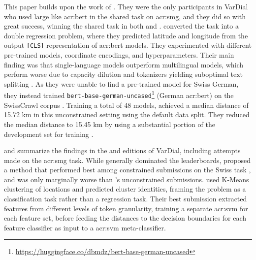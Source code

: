 This paper builds upon the work of \cite{scherrerHeLjuVarDial20202020}. They were the only participants in VarDial who used large  like \acrshort{acr:bert} in the shared task on \gls{acr:smg}, and they did so with great success, winning the shared task in both \citeyear{scherrerHeLjuVarDial20202020} and \citeyear{scherrerSocialMediaVariety2021}. \citeauthor{scherrerHeLjuVarDial20202020} converted the task into a double regression problem, where they predicted latitude and longitude from the output \texttt{[CLS]} representation of \acrshort{acr:bert} models. They experimented with different pre-trained models, coordinate encodings, and hyperparameters. Their main finding was that single-language models outperform multilingual models, which perform worse due to capacity dilution and tokenizers yielding suboptimal text splitting \citep[3]{scherrerHeLjuVarDial20202020}. As they were unable to find a pre-trained model for Swiss German, they instead trained \texttt{bert-base-german-uncased}\footnote{\url{https://huggingface.co/dbmdz/bert-base-german-uncased}} (German \acrshort{acr:bert}) on the SwissCrawl corpus \citep{linderAutomaticCreationText2020}. Training a total of 48 models, \citeauthor{scherrerHeLjuVarDial20202020} achieved a median distance of 15.72 km in this unconstrained setting using the default data split. They reduced the median distance to 15.45 km by using a substantial portion of the development set for training \citep[6]{scherrerHeLjuVarDial20202020}.

\cite{gamanReportVarDialEvaluation2020} and \cite{chakravarthiFindingsVarDialEvaluation2021} summarize the findings in the \citeyear{gamanReportVarDialEvaluation2020} and \citeyear{chakravarthiFindingsVarDialEvaluation2021} editions of VarDial, including attempts made on the \gls{acr:smg} task. While \cite{scherrerHeLjuVarDial20202020} generally dominated the leaderboards, \cite{benitesdeazevedoesouzaZHAWInITSocialMedia2020} proposed a method that performed best among constrained submissions on the Swiss task \citep[8-9]{gamanReportVarDialEvaluation2020}, and was only marginally worse than \citeauthor{scherrerHeLjuVarDial20202020}'s unconstrained submissions. \cite{benitesdeazevedoesouzaZHAWInITSocialMedia2020} used K-Means clustering \citep{lloydLeastSquaresQuantization1982a} of locations and predicted cluster identities, framing the problem as a classification task rather than a regression task. Their best submission extracted features from different levels of token granularity, training a separate \gls{acr:svm} for each feature set, before feeding the distances to the decision boundaries for each feature classifier as input to a \gls{acr:svm} meta-classifier.
